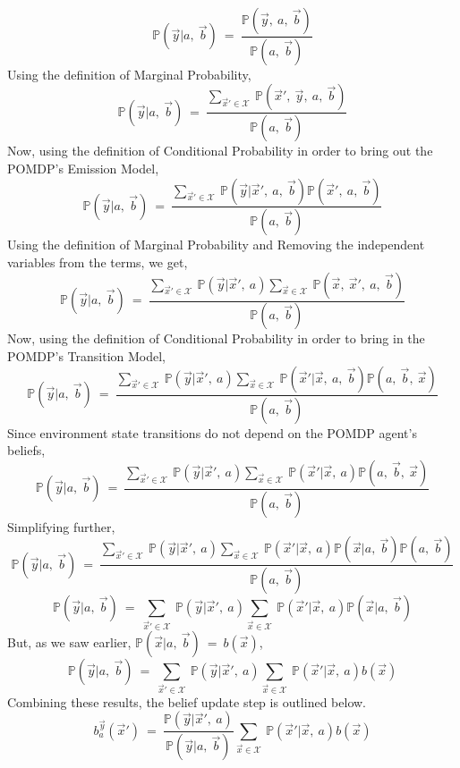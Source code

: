 \documentclass[12pt, draftcls, onecolumn]{IEEEtran}
\begin{document}
\begin{itemize}
    \[\mathbb{P}(\vec{y}|a,\ \vec{b})\ =\ \frac{\mathbb{P}(\vec{y},\ a,\ \vec{b})}{\mathbb{P}(a,\ \vec{b})}\]
    Using the definition of Marginal Probability,
    \[\mathbb{P}(\vec{y}|a,\ \vec{b})\ =\ \frac{\sum_{\vec{x}' \in \mathcal{X}}\ \mathbb{P}(\vec{x}',\ \vec{y},\ a,\ \vec{b})}{\mathbb{P}(a,\ \vec{b})}\]
    Now, using the definition of Conditional Probability in order to bring out the POMDP's Emission Model,
    \[\mathbb{P}(\vec{y}|a,\ \vec{b})\ =\ \frac{\sum_{\vec{x}' \in \mathcal{X}}\ \mathbb{P}(\vec{y}|\vec{x}',\ a,\ \vec{b})\mathbb{P}(\vec{x}',\ a,\ \vec{b})}{\mathbb{P}(a,\ \vec{b})}\]
    Using the definition of Marginal Probability and Removing the independent variables from the terms, we get,
    \[\mathbb{P}(\vec{y}|a,\ \vec{b})\ =\ \frac{\sum_{\vec{x}' \in \mathcal{X}}\ \mathbb{P}(\vec{y}|\vec{x}',\ a)\sum_{\vec{x} \in \mathcal{X}}\ \mathbb{P}(\vec{x},\ \vec{x}',\ a,\ \vec{b})}{\mathbb{P}(a,\ \vec{b})}\]
    Now, using the definition of Conditional Probability in order to bring in the POMDP's Transition Model,
    \[\mathbb{P}(\vec{y}|a,\ \vec{b})\ =\ \frac{\sum_{\vec{x}' \in \mathcal{X}}\ \mathbb{P}(\vec{y}|\vec{x}',\ a)\sum_{\vec{x} \in \mathcal{X}}\ \mathbb{P}(\vec{x}'|\vec{x},\ a,\ \vec{b})\mathbb{P}(a,\ \vec{b},\ \vec{x})}{\mathbb{P}(a,\ \vec{b})}\]
    Since environment state transitions do not depend on the POMDP agent's beliefs,
    \[\mathbb{P}(\vec{y}|a,\ \vec{b})\ =\ \frac{\sum_{\vec{x}' \in \mathcal{X}}\ \mathbb{P}(\vec{y}|\vec{x}',\ a)\sum_{\vec{x} \in \mathcal{X}}\ \mathbb{P}(\vec{x}'|\vec{x},\ a)\mathbb{P}(a,\ \vec{b},\ \vec{x})}{\mathbb{P}(a,\ \vec{b})}\]
    Simplifying further,
    \[\mathbb{P}(\vec{y}|a,\ \vec{b})\ =\ \frac{\sum_{\vec{x}' \in \mathcal{X}}\ \mathbb{P}(\vec{y}|\vec{x}',\ a)\sum_{\vec{x} \in \mathcal{X}}\ \mathbb{P}(\vec{x}'|\vec{x},\ a)\mathbb{P}(\vec{x}|a,\ \vec{b})\mathbb{P}(a,\ \vec{b})}{\mathbb{P}(a,\ \vec{b})}\]
    \[\mathbb{P}(\vec{y}|a,\ \vec{b})\ =\ \sum_{\vec{x}' \in \mathcal{X}}\ \mathbb{P}(\vec{y}|\vec{x}',\ a)\sum_{\vec{x} \in \mathcal{X}}\ \mathbb{P}(\vec{x}'|\vec{x},\ a)\mathbb{P}(\vec{x}|a,\ \vec{b})\]
    But, as we saw earlier, $\mathbb{P}(\vec{x}|a,\ \vec{b})\ =\ b(\vec{x})$,
    \[\mathbb{P}(\vec{y}|a,\ \vec{b})\ =\ \sum_{\vec{x}' \in \mathcal{X}}\ \mathbb{P}(\vec{y}|\vec{x}',\ a)\sum_{\vec{x} \in \mathcal{X}}\ \mathbb{P}(\vec{x}'|\vec{x},\ a)b(\vec{x})\]
    Combining these results, the belief update step is outlined below.
    \begin{equation}\label{94}
        b_a^{\vec{y}}(\vec{x}')\ =\ \frac{\mathbb{P}(\vec{y}|\vec{x}',\ a)}{\mathbb{P}(\vec{y}|a,\ \vec{b})}\sum_{\vec{x} \in \mathcal{X}}\ \mathbb{P}(\vec{x}'|\vec{x},\ a)b(\vec{x})

\end{equation}
\end{itemize}
\end{document}
